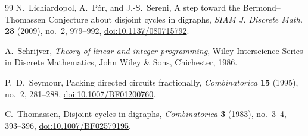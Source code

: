 \documentclass[10pt,a4paper]{article}
\numberwithin{equation}{section}
\begin{document}
\begin{thebibliography}{99}
N.~Lichiardopol, A.~P\'{o}r, and J.-S.~Sereni,
A step toward the Bermond--Thomassen Conjecture about disjoint
cycles in digraphs,
\emph{SIAM J. Discrete Math.} \textbf{23} (2009),
no.~2, 979--992,
\href{https://doi.org/10.1137/080715792}{doi:10.1137/080715792}.


A.~Schrijver, \emph{Theory of linear and integer programming},
Wiley-Interscience Series in Discrete Mathematics,
John Wiley \& Sons, Chichester, 1986.


P.~D.~Seymour, Packing directed circuits fractionally,
\emph{Combinatorica} \textbf{15} (1995), no.~2, 281--288,
\href{https://doi.org/10.1007/BF01200760}{doi:10.1007/BF01200760}.


C.~Thomassen,
Disjoint cycles in digraphs,
\emph{Combinatorica} \textbf{3} (1983),
no.~3--4, 393--396,
\href{https://doi.org/10.1007/BF02579195}{doi:10.1007/BF02579195}.



\end{thebibliography}
\end{document}
